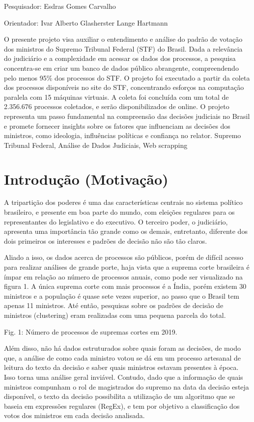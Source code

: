     {
        \noindent Pesquisador: Esdras Gomes Carvalho

        \noindent Orientador: Ivar Alberto Glasherster Lange Hartmann
    }
    {O presente projeto visa auxiliar o entendimento e análise do padrão de votação dos ministros do Supremo Tribunal Federal (STF) do Brasil. Dada a relevância do judiciário e a complexidade em acessar os dados dos processos, a pesquisa concentra-se em criar um banco de dados público abrangente, compreendendo pelo menos 95\% dos processos do STF. O projeto foi executado a partir da coleta dos processos disponíveis no site do STF, concentrando esforços na computação paralela com 15 máquinas virtuais. A coleta foi concluída com um total de 2.356.676 processos coletados, e serão disponibilizados de online. O projeto representa um passo fundamental na compreensão das decisões judiciais no Brasil e promete fornecer insights sobre os fatores que influenciam as decisões dos ministros, como ideologia, influências políticas e confiança no relator.
    }
    {Supremo Tribunal Federal, Análise de Dados Judiciais, Web scrapping}


\section{Introdução (Motivação)}

	A tripartição dos poderes é uma das características centrais no sistema político brasileiro, e presente em boa parte do mundo, com eleições regulares para os representantes do legislativo e do executivo. O terceiro poder, o judiciário, apresenta uma importância tão grande como os demais, entretanto, diferente dos dois primeiros os interesses e padrões de decisão não são tão claros.
    
	Aliado a isso, os dados acerca de processos são públicos, porém de difícil acesso para realizar análises de grande porte, haja vista que a suprema corte brasileira é ímpar em relação ao número de processos anuais, como pode ser visualizado na figura 1. A única suprema corte com mais processos é a Índia, porém existem 30 ministros e a população é quase sete vezes superior, ao passo que o Brasil tem apenas 11 ministros. Até então, pesquisas sobre os padrões de decisão de ministros (clustering) eram realizadas com uma pequena parcela do total. 

Fig. 1: Número de processos de supremas cortes em 2019.

	Além disso, não há dados estruturados sobre quais foram as decisões, de modo que, a análise de como cada ministro votou se dá em um processo artesanal de leitura do texto da decisão e saber quais ministros estavam presentes à época. Isso torna uma análise geral inviável. Contudo, dado que a informação de quais ministros compunham o rol de magistrados do supremo na data da decisão esteja disponível, o texto da decisão possibilita a utilização de um algoritmo que se baseia em expressões regulares (RegEx), e tem por objetivo a classificação dos votos dos ministros em cada decisão analisada.

